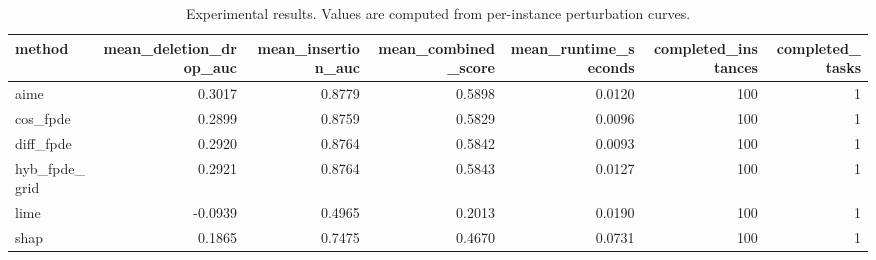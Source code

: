 \begin{table}[t]
\caption{Experimental results. Values are computed from per-instance perturbation curves.}
\label{tab:main_results_computed}
\centering
\begin{tabular}{lrrrrrr}
\toprule
method & mean\_deletion\_drop\_auc & mean\_insertion\_auc & mean\_combined\_score & mean\_runtime\_seconds & completed\_instances & completed\_tasks \\
\midrule
aime & 0.3017 & 0.8779 & 0.5898 & 0.0120 & 100 & 1 \\
cos\_fpde & 0.2899 & 0.8759 & 0.5829 & 0.0096 & 100 & 1 \\
diff\_fpde & 0.2920 & 0.8764 & 0.5842 & 0.0093 & 100 & 1 \\
hyb\_fpde\_grid & 0.2921 & 0.8764 & 0.5843 & 0.0127 & 100 & 1 \\
lime & -0.0939 & 0.4965 & 0.2013 & 0.0190 & 100 & 1 \\
shap & 0.1865 & 0.7475 & 0.4670 & 0.0731 & 100 & 1 \\
\bottomrule
\end{tabular}

\end{table}

